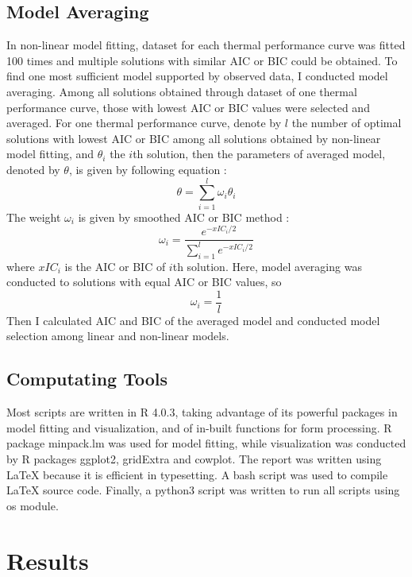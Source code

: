 \documentclass[11pt]{article}
\begin{document}
  \subsection{Model Averaging}
  In non-linear model fitting, dataset for each thermal performance curve was fitted 100 times and multiple solutions 
  with similar AIC or BIC could 
  be obtained. To find one most sufficient model supported by observed data, I conducted model averaging. 
  Among all solutions obtained through dataset of one thermal performance curve, those with lowest AIC or BIC values 
  were selected and averaged. 
  For one thermal performance curve, denote by $l$ the number of optimal solutions with lowest AIC or BIC among all solutions 
  obtained 
  by non-linear model fitting, and $\theta_i$ the $i$th solution, then the parameters of averaged model, denoted by $\theta$, 
  is given by following equation \cite{johnson2004model, buckland1997model}:
  \begin{equation}
    \theta = \sum_{i=1}^{l}\omega_i\theta_i
  \end{equation}
  The weight $\omega_i$ is given by smoothed AIC or BIC method \cite{buckland1997model}:
  \begin{equation}
    \omega_i = \frac{e^{-xIC_i/2}}{\sum_{i=1}^{l}e^{-xIC_i/2}}
  \end{equation}   
  where $xIC_i$ is the AIC or BIC of $i$th solution. Here, model averaging was conducted to solutions with equal AIC 
  or BIC values, 
  so 
  \begin{equation}
    \omega_i = \frac{1}{l}
  \end{equation}
  Then I calculated AIC and BIC of the averaged model and conducted model selection among linear and non-linear models.
  
  
  \subsection{Computating Tools}
  Most scripts are written in R 4.0.3, taking advantage of its powerful packages in model fitting 
  and visualization, and of in-built functions for form processing. R package minpack.lm was used for model 
  fitting, while visualization was conducted by R packages ggplot2, gridExtra and cowplot. 
  The report was written using LaTeX because it is efficient in typesetting. 
  A bash script was used to compile LaTeX source code. 
  Finally, a python3 script was written to run all scripts using os module. 

  \section{Results}
\end{document}

